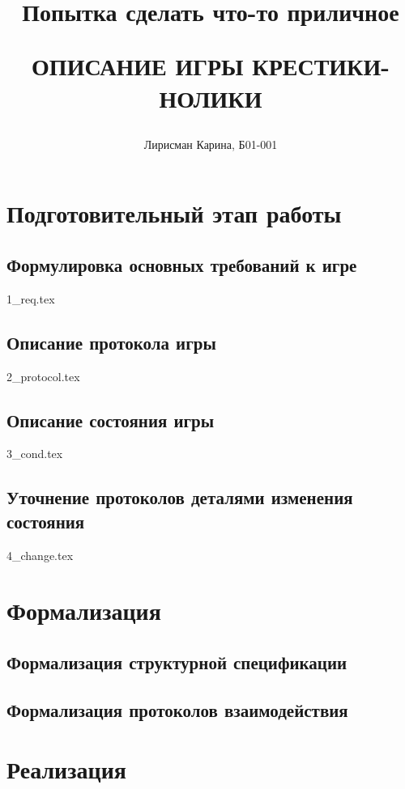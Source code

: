 \documentclass[a5paper,10pt, twoside]{article} %
\title
{
\hfill \break	\hfill \break
\hfill \break	\hfill \break
Попытка сделать что-то приличное

ОПИСАНИЕ ИГРЫ КРЕСТИКИ-НОЛИКИ
}
\author{Лирисман Карина, Б01-001}
\begin{document}
\maketitle


\thispagestyle{empty} %

\newpage

\tableofcontents %
\thispagestyle{plain}
\newpage


\section{Подготовительный этап работы}

  \subsection{Формулировка основных требований к игре}
  {1_req.tex}

  \subsection{Описание протокола игры}
  {2_protocol.tex}

  \subsection{Описание состояния игры}
  {3_cond.tex}
  
   \subsection{Уточнение протоколов деталями изменения состояния}
  {4_change.tex}



\section{Формализация}

	\subsection{Формализация структурной спецификации}

	\subsection{Формализация протоколов взаимодействия}


\section{Реализация}
\end{document}
